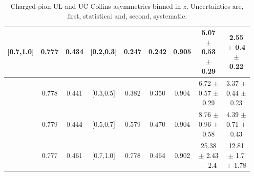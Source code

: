 \begin{table}[H]
\begin{tabular}{|c|c|c|c|c|c|c|c|c|}
[0.7,1.0]	&	0.777	&	0.434	&	[0.2,0.3]	&	0.247	&	0.242	&	0.905	&5.07  $\pm$ 0.53  $\pm$ 0.29   &	2.55  $\pm$ 0.4  $\pm$ 0.22   \\ \hline
[0.7,1.0]	&	0.778	&	0.441	&	[0.3,0.5]	&	0.382	&	0.350	&	0.904	&6.72  $\pm$ 0.57  $\pm$ 0.29   &	3.37  $\pm$ 0.44  $\pm$ 0.23  \\ \hline
[0.7,1.0]	&	0.779	&	0.444	&	[0.5,0.7]	&	0.579	&	0.470	&	0.904	&8.76  $\pm$ 0.96  $\pm$ 0.58   &	4.39  $\pm$ 0.71  $\pm$ 0.43  \\ \hline
[0.7,1.0]	&	0.777	&	0.461	&	[0.7,1.0]	&	0.778	&	0.464	&	0.902	&25.38  $\pm$ 2.43  $\pm$ 2.4   &	12.81  $\pm$ 1.7  $\pm$ 1.78  \\ \hline
\end{tabular}
\caption[Charged-pion UL and UC Collins asymmetries binned in $z$]{Charged-pion UL and UC Collins asymmetries binned in $z$. Uncertainties are, first, statistical and, second, systematic.}
\label{tab:finaluluczbin}
\end{table} 

